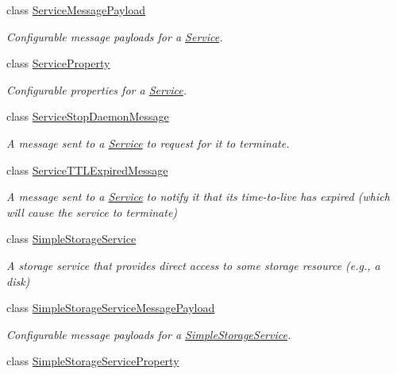 \begin{DoxyCompactItemize}
class \hyperlink{classwrench_1_1_service_message_payload}{Service\+Message\+Payload}
\begin{DoxyCompactList}\small\item\em Configurable message payloads for a \hyperlink{classwrench_1_1_service}{Service}. \end{DoxyCompactList}\item 
class \hyperlink{classwrench_1_1_service_property}{Service\+Property}
\begin{DoxyCompactList}\small\item\em Configurable properties for a \hyperlink{classwrench_1_1_service}{Service}. \end{DoxyCompactList}\item 
class \hyperlink{classwrench_1_1_service_stop_daemon_message}{Service\+Stop\+Daemon\+Message}
\begin{DoxyCompactList}\small\item\em A message sent to a \hyperlink{classwrench_1_1_service}{Service} to request for it to terminate. \end{DoxyCompactList}\item 
class \hyperlink{classwrench_1_1_service_t_t_l_expired_message}{Service\+T\+T\+L\+Expired\+Message}
\begin{DoxyCompactList}\small\item\em A message sent to a \hyperlink{classwrench_1_1_service}{Service} to notify it that its time-\/to-\/live has expired (which will cause the service to terminate) \end{DoxyCompactList}\item 
class \hyperlink{classwrench_1_1_simple_storage_service}{Simple\+Storage\+Service}
\begin{DoxyCompactList}\small\item\em A storage service that provides direct access to some storage resource (e.\+g., a disk) \end{DoxyCompactList}\item 
class \hyperlink{classwrench_1_1_simple_storage_service_message_payload}{Simple\+Storage\+Service\+Message\+Payload}
\begin{DoxyCompactList}\small\item\em Configurable message payloads for a \hyperlink{classwrench_1_1_simple_storage_service}{Simple\+Storage\+Service}. \end{DoxyCompactList}\item 
class \hyperlink{classwrench_1_1_simple_storage_service_property}{Simple\+Storage\+Service\+Property}

\end{DoxyCompactItemize}

